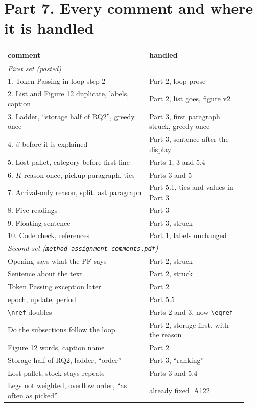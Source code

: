 \documentclass[11pt,a4paper]{article}
\begin{document}
\section*{Part 7. Every comment and where it is handled}
\small
\begin{longtable}{p{0.55\linewidth}p{0.38\linewidth}}
\toprule
comment & handled \\
\midrule
\multicolumn{2}{l}{\emph{First set (pasted)}} \\
1. Token Passing in loop step 2 & Part 2, loop prose \\
2. List and Figure 12 duplicate, labels, caption & Part 2, list goes, figure v2 \\
3. Ladder, ``storage half of RQ2'', greedy once & Part 3, first paragraph struck, greedy once \\
4. $\beta$ before it is explained & Part 3, sentence after the display \\
5. Lost pallet, category before first line & Parts 1, 3 and 5.4 \\
6. $K$ reason once, pickup paragraph, ties & Parts 3 and 5 \\
7. Arrival-only reason, split last paragraph & Part 5.1, ties and values in Part 3 \\
8. Five readings & Part 3 \\
9. Floating sentence & Part 3, struck \\
10. Code check, references & Part 1, labels unchanged \\
\midrule
\multicolumn{2}{l}{\emph{Second set (\texttt{method\_assignment\_comments.pdf})}} \\
Opening says what the PF says & Part 2, struck \\
Sentence about the text & Part 2, struck \\
Token Passing exception later & Part 2 \\
epoch, update, period & Part 5.5 \\
\texttt{\textbackslash nref} doubles & Parts 2 and 3, now \texttt{\textbackslash eqref} \\
Do the subsections follow the loop & Part 2, storage first, with the reason \\
Figure 12 words, caption name & Part 2 \\
Storage half of RQ2, ladder, ``order'' & Part 3, ``ranking'' \\
Lost pallet, stock stays repeats & Parts 3 and 5.4 \\
Legs not weighted, overflow order, ``as often as picked'' & already fixed [A122] \\

\end{longtable}
\end{document}
